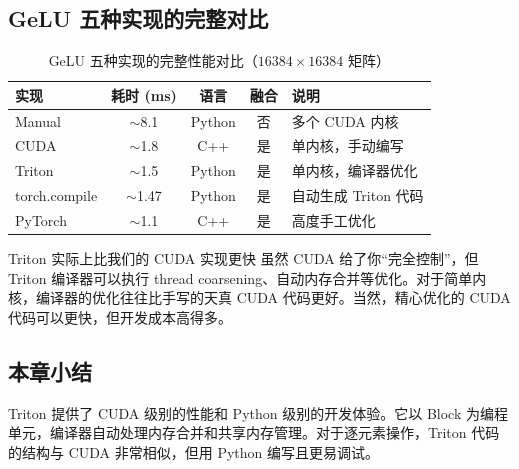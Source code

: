 \subsection{GeLU 五种实现的完整对比}

\begin{table}[H]
\centering
\begin{tabular}{lcccl}
\toprule
\textbf{实现} & \textbf{耗时 (ms)} & \textbf{语言} & \textbf{融合} & \textbf{说明} \\
\midrule
Manual & $\sim$8.1 & Python & 否 & 多个 CUDA 内核 \\
CUDA & $\sim$1.8 & C++ & 是 & 单内核，手动编写 \\
Triton & $\sim$1.5 & Python & 是 & 单内核，编译器优化 \\
torch.compile & $\sim$1.47 & Python & 是 & 自动生成 Triton 代码 \\
PyTorch & $\sim$1.1 & C++ & 是 & 高度手工优化 \\
\bottomrule
\end{tabular}
\caption{GeLU 五种实现的完整性能对比（$16384 \times 16384$ 矩阵）}
\end{table}

\begin{knowledgebox}{Triton 实际上比我们的 CUDA 实现更快}
虽然 CUDA 给了你``完全控制''，但 Triton 编译器可以执行 thread coarsening、自动内存合并等优化。对于简单内核，编译器的优化往往比手写的天真 CUDA 代码更好。当然，精心优化的 CUDA 代码可以更快，但开发成本高得多。
\end{knowledgebox}

\subsection{本章小结}

Triton 提供了 CUDA 级别的性能和 Python 级别的开发体验。它以 Block 为编程单元，编译器自动处理内存合并和共享内存管理。对于逐元素操作，Triton 代码的结构与 CUDA 非常相似，但用 Python 编写且更易调试。


